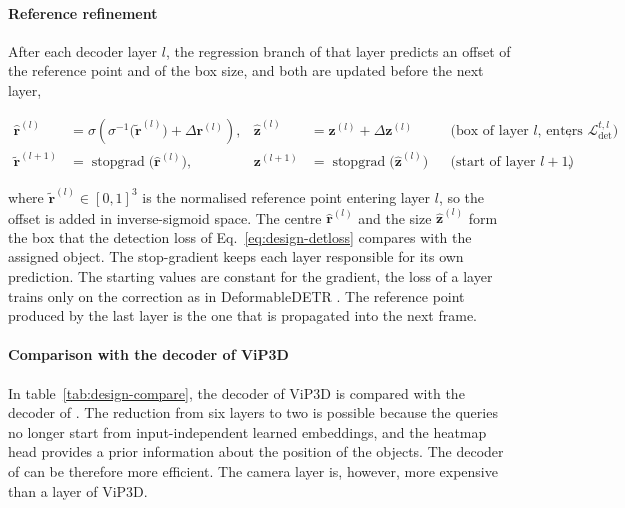\paragraph{Reference refinement}
\label{subsec:design-refine}

After each decoder layer $l$, the regression branch of that layer predicts an offset of the reference point
and of the box size, and both are updated before the next layer,

\begin{equation}
    \begin{aligned}
        \hat{\mathbf{r}}^{(l)} &= \sigma\!\left( \sigma^{-1}\big( \tilde{\mathbf{r}}^{(l)} \big) +
        \Delta \mathbf{r}^{(l)} \right), &
        \hat{\mathbf{z}}^{(l)} &= \mathbf{z}^{(l)} + \Delta \mathbf{z}^{(l)}
        & &\text{(box of layer $l$, enters $\mathcal{L}_{\mathrm{det}}^{t,l}$)}, \\
        \tilde{\mathbf{r}}^{(l+1)} &= \operatorname{stopgrad}\big( \hat{\mathbf{r}}^{(l)} \big), &
        \mathbf{z}^{(l+1)} &= \operatorname{stopgrad}\big( \hat{\mathbf{z}}^{(l)} \big)
        & &\text{(start of layer $l+1$)},
    \end{aligned}
    \label{eq:design-refine}
\end{equation}

where $\tilde{\mathbf{r}}^{(l)} \in [0, 1]^3$ is the normalised reference point entering layer $l$, so the
offset is added in inverse-sigmoid space. The centre $\hat{\mathbf{r}}^{(l)}$ and the size
$\hat{\mathbf{z}}^{(l)}$ form the box that the detection loss of Eq.~\eqref{eq:design-detloss} compares with
the assigned object. The stop-gradient keeps each layer responsible for its own prediction. 
The starting values are constant for the gradient, the loss of a layer trains only on the correction as in DeformableDETR \cite{Zhu2021DeformableDETR}. 
The reference point produced by the last layer is the one that is propagated into the next frame.

\paragraph{Comparison with the decoder of ViP3D}
\label{subsec:design-compare}
In table~\ref{tab:design-compare}, the decoder of ViP3D is compared with the decoder of \modelname. 
The reduction from six layers to two is possible because the queries no longer start from input-independent learned embeddings, 
and the heatmap head provides a prior information about the position of the objects. The decoder of \modelname can be therefore more efficient. 
The camera layer is, however, more expensive than a layer of ViP3D. 


